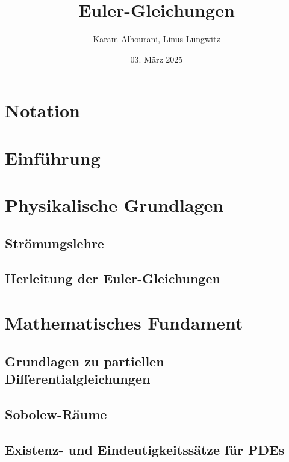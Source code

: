 \documentclass[11pt,a4paper]{article}
\author{Karam Alhourani, Linus Lungwitz}
\title{Euler-Gleichungen}
\date{03. März 2025}
\theoremstyle{definition}
\numberwithin{equation}{section} %
\begin{document}
\maketitle

\newpage

\tableofcontents

\newpage

\section*{Notation}



\newpage

\section{Einführung}



\section{Physikalische Grundlagen}

\subsection{Strömungslehre}

\subsection{Herleitung der Euler-Gleichungen}

\section{Mathematisches Fundament}

\subsection{Grundlagen zu partiellen Differentialgleichungen}



\subsection{Sobolew-Räume}



\subsection{Existenz- und Eindeutigkeitssätze für PDEs}
\end{document}

